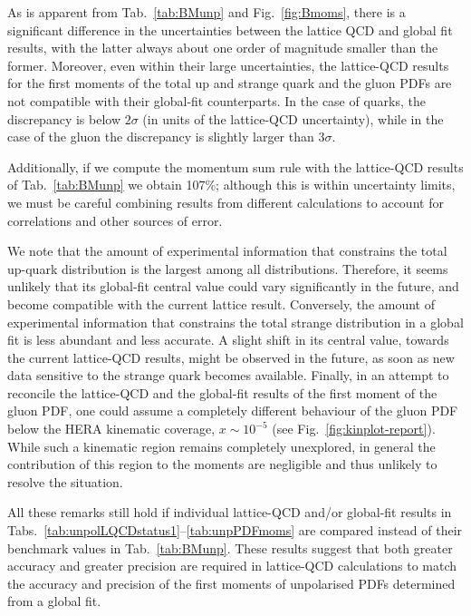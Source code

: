 As is apparent from Tab.~\ref{tab:BMunp} and Fig.~\ref{fig:Bmoms}, there is a 
significant difference in the uncertainties between the lattice QCD and 
global fit results, with the latter always about one order of magnitude 
smaller than the former.
%
Moreover, even within their large uncertainties, the lattice-QCD results 
for the first moments of the total up and strange quark and the gluon PDFs
are not compatible with their global-fit counterparts.
%
In the case of quarks, the discrepancy is below $2\sigma$ (in units of the 
lattice-QCD uncertainty), while in the case of the gluon the discrepancy is
slightly larger than $3\sigma$.

Additionally, if we compute the momentum sum rule with the lattice-QCD results of Tab.~\ref{tab:BMunp}
we obtain 107\%; although this is within uncertainty limits, we must be careful 
combining results from different calculations to account for correlations
and other sources of error. 

We note that the amount of experimental information that constrains the
total up-quark distribution is the largest among all distributions.
%
Therefore, it seems unlikely that its global-fit central value could vary 
significantly in the future, and become compatible with the current
lattice result.
%
Conversely, the amount of experimental information that constrains the
total strange distribution in a global fit is less abundant and less accurate.
%
A slight shift in its central value, towards the current lattice-QCD results,
might be observed in the future, as soon as new data sensitive to the strange 
quark becomes available.
%
Finally, in an attempt to reconcile the lattice-QCD and the global-fit results
of the first moment of the gluon PDF, one could assume a completely
different behaviour of the gluon PDF below the HERA kinematic
coverage, $x\sim 10^{-5}$ (see Fig.~\ref{fig:kinplot-report}).
%
While such a kinematic region remains completely unexplored,
in general the contribution of this region to the moments are negligible
and thus unlikely to resolve the situation. 

All these remarks still hold if individual lattice-QCD and/or global-fit
results in Tabs.~\ref{tab:unpolLQCDstatus1}--\ref{tab:unpPDFmoms} are 
compared instead of their benchmark values in Tab.~\ref{tab:BMunp}. 
%
These results suggest that both greater accuracy and greater precision are
required in lattice-QCD calculations to match the accuracy and 
precision of the first moments of unpolarised PDFs determined from a global
fit.


